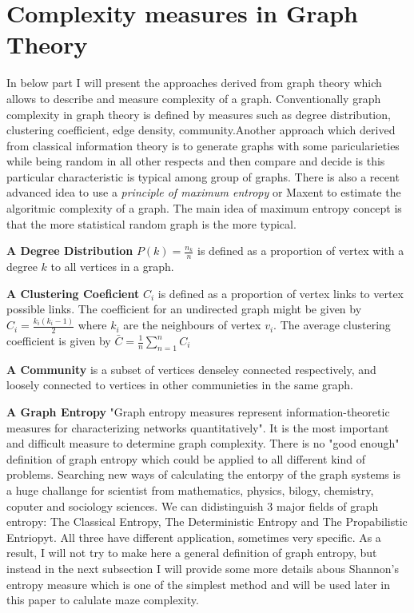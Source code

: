 \section{Complexity measures in Graph Theory}
In below part I will present the approaches derived from graph theory which allows to describe and measure complexity of a graph. 
Conventionally graph complexity in graph theory is defined by measures such as degree distribution, clustering coefficient, edge density, community.Another approach which derived from classical information theory is to 
generate graphs with some paricularieties while being random in all other respects and then compare and decide is this particular characteristic is typical among group of graphs. There is also a recent advanced idea to use a \textit{principle of maximum entropy} or Maxent to estimate the algoritmic complexity of a graph. The main idea 
of maximum entropy concept is that the more statistical random graph is the more typical. \cite{HeZeni}
\begin{definition}\textbf{A Degree Distribution}  $P(k) = \frac{n_k}{n}$ is defined as a proportion of vertex with a degree $k$ to all vertices in a graph. \end{definition}  
\begin{definition}\textbf{A Clustering Coeficient} $C_i$ is defined as a proportion of vertex links to vertex possible links. The coefficient for an undirected graph might be given by $C_i = \frac{k_i(k_i-1)}{2}$ where $k_i$ are the neighbours of vertex $v_i$. The average clustering coefficient is given by $\bar{C} = \frac{1}{n}\sum_{n = 1}^{n} C_i $\end{definition}
\begin{definition}\textbf{A Community} is a subset of vertices denseley connected respectively, and loosely connected to vertices in other communieties in the same graph.\end{definition}
\begin{definition}\textbf{A Graph Entropy} "Graph entropy measures represent information-theoretic measures for characterizing networks quantitatively"\cite{MaDehm}. It is the most important and difficult measure to determine graph complexity. There is no "good enough" definition of graph entropy which could be applied to all different kind of problems. Searching new ways of calculating the entorpy of the graph systems is a huge challange for scientist from mathematics, physics, bilogy, chemistry, coputer and sociology sciences. We can didistinguish 3 major fields of graph entropy: The Classical Entropy, The Deterministic Entropy and The Propabilistic Entriopyt. All three have different application, sometimes very specific.  As a result, I will not try to make here a general definition of graph entropy, but instead in the next subsection I will provide some more details abous Shannon's entropy measure which is one of the simplest method and will  be used later in this paper to calulate maze complexity. 
\end{definition}  
